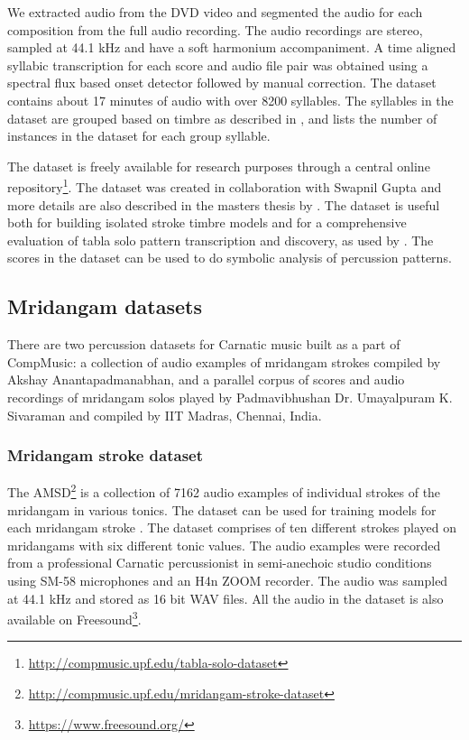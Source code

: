 We extracted audio from the DVD video and segmented the audio for each composition from the full audio recording. The audio recordings are stereo, sampled at 44.1 kHz and have a soft harmonium accompaniment. A time aligned syllabic transcription for each score and audio file pair was obtained using a spectral flux based onset detector \cite{bello:05:onset} followed by manual correction. The dataset contains about 17 minutes of audio with over 8200 syllables. The syllables in the dataset are grouped based on timbre as described in , and  lists the number of instances in the dataset for each group syllable. 

The dataset is freely available for research purposes through a central online repository\footnote{\url{http://compmusic.upf.edu/tabla-solo-dataset}}. The dataset was created in collaboration with Swapnil Gupta and more details are also described in the masters thesis by . The dataset is useful both for building isolated stroke timbre models and for a comprehensive evaluation of \gls{tabla} solo pattern transcription and discovery, as used by . The scores in the dataset can be used to do symbolic analysis of percussion patterns. 
\subsection{Mridangam datasets}\label{sec:mridangamdatasets}
There are two percussion datasets for Carnatic music built as a part of CompMusic: a collection of audio examples of mridangam strokes compiled by Akshay Anantapadmanabhan, and a parallel corpus of scores and audio recordings of mridangam solos played by Padmavibhushan Dr. Umayalpuram K. Sivaraman and compiled by IIT Madras, Chennai, India. 
%
\subsubsection{Mridangam stroke dataset}
The \acrfull{AMSD}\footnote{\url{http://compmusic.upf.edu/mridangam-stroke-dataset}} is a collection of 7162 audio examples of individual strokes of the mridangam in various tonics. The dataset can be used for training models for each mridangam stroke \cite{akshay:13:mridangam}. The dataset comprises of ten different strokes played on mridangams with six different tonic values. The audio examples were recorded from a professional Carnatic percussionist in semi-anechoic studio conditions using SM-58 microphones and an H4n ZOOM recorder. The audio was sampled at 44.1 kHz and stored as 16 bit WAV files. All the audio in the dataset is also available on Freesound\footnote{\url{https://www.freesound.org/}}. 

